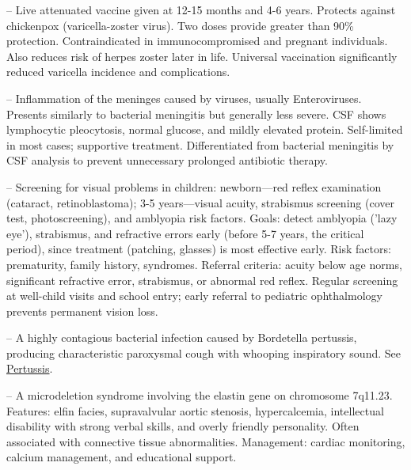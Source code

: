 -- Live attenuated vaccine given at 12-15 months and 4-6 years. Protects against chickenpox (varicella-zoster virus). Two doses provide greater than 90\% protection. Contraindicated in immunocompromised and pregnant individuals. Also reduces risk of herpes zoster later in life. Universal vaccination significantly reduced varicella incidence and complications.

-- Inflammation of the meninges caused by viruses, usually Enteroviruses. Presents similarly to bacterial meningitis but generally less severe. CSF shows lymphocytic pleocytosis, normal glucose, and mildly elevated protein. Self-limited in most cases; supportive treatment. Differentiated from bacterial meningitis by CSF analysis to prevent unnecessary prolonged antibiotic therapy.

-- Screening for visual problems in children: newborn—red reflex examination (cataract, retinoblastoma); 3-5 years—visual acuity, strabismus screening (cover test, photoscreening), and amblyopia risk factors. Goals: detect amblyopia ('lazy eye'), strabismus, and refractive errors early (before 5-7 years, the critical period), since treatment (patching, glasses) is most effective early. Risk factors: prematurity, family history, syndromes. Referral criteria: acuity below age norms, significant refractive error, strabismus, or abnormal red reflex. Regular screening at well-child visits and school entry; early referral to pediatric ophthalmology prevents permanent vision loss.

-- A highly contagious bacterial infection caused by Bordetella pertussis, producing characteristic paroxysmal cough with whooping inspiratory sound. See \hyperlink{Pertussis}{Pertussis}.

-- A microdeletion syndrome involving the elastin gene on chromosome 7q11.23. Features: elfin facies, supravalvular aortic stenosis, hypercalcemia, intellectual disability with strong verbal skills, and overly friendly personality. Often associated with connective tissue abnormalities. Management: cardiac monitoring, calcium management, and educational support.

